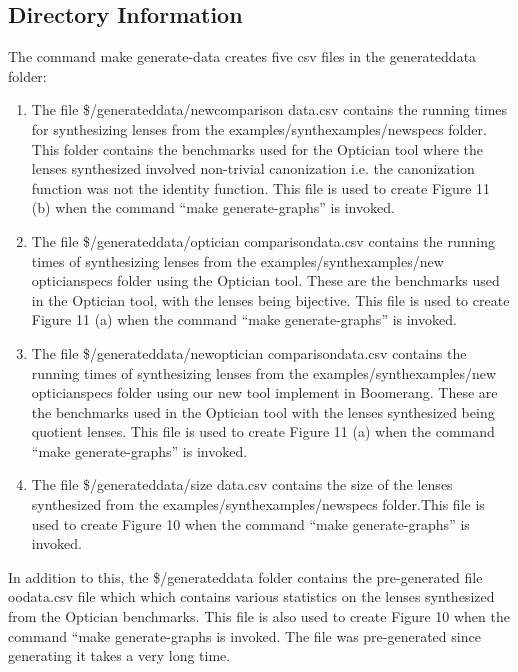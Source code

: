 \documentclass[acmsmall,review,anonymous]{acmart}
\begin{document}
\subsection{Directory Information}
The command make generate-data creates five csv files in the
generated\textunderscore data folder:
\begin{enumerate}
  \item
  The file
\$/generated\textunderscore data/new\textunderscore comparison\textunderscore
data.csv contains the running times for synthesizing lenses from the
examples/synthexamples/new\textunderscore specs folder. This folder contains the
benchmarks used for the Optician tool where the lenses
synthesized involved non-trivial canonization i.e. the canonization function was
not the identity function. This file is used to create Figure 11 (b) when the
command ``make generate-graphs'' is invoked.
\item
The file
\$/generated\textunderscore data/optician\textunderscore
comparison\textunderscore data.csv contains the running times of synthesizing
lenses from the examples/synthexamples/new\textunderscore
optician\textunderscore specs folder using the Optician tool. These are the
benchmarks used in the Optician tool, with the lenses being bijective. This file
is used to create Figure 11 (a) when the command ``make generate-graphs'' is
invoked.
\item
The file
\$/generated\textunderscore data/new\textunderscore optician\textunderscore
comparison\textunderscore data.csv contains the running times of synthesizing
lenses from the examples/synthexamples/new\textunderscore
optician\textunderscore specs folder using our new tool implement in Boomerang.
These are the benchmarks used in the Optician tool with the lenses synthesized
being quotient lenses. This file is used to create Figure 11 (a) when the
command ``make generate-graphs'' is invoked.
\item
The file \$/generated\textunderscore data/size \textunderscore data.csv contains
the size of the lenses synthesized from the 
examples/synthexamples/new\textunderscore specs folder.This file is used to
create Figure 10 when the command ``make generate-graphs'' is invoked.
\end{enumerate}

In addition to this, the \$/generated\textunderscore data folder contains the
pre-generated file oo\textunderscore data.csv file which which contains various
statistics on the lenses synthesized from the Optician benchmarks. This file
is also used to create Figure 10 when the command ``make generate-graphs is
invoked. The file was pre-generated since generating it takes a very long time.
\end{document}
